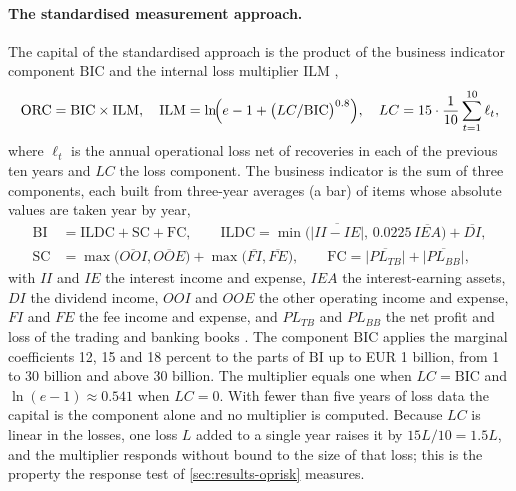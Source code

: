 \paragraph{The standardised measurement approach.} The capital of the standardised approach is the product of the business
indicator component $\mathrm{BIC}$ and the internal loss multiplier $\mathrm{ILM}$ \citep{oprisk:ope25},
\begin{equation}
\mathrm{ORC}=\mathrm{BIC}\times\mathrm{ILM},\quad
\mathrm{ILM}=\ln\!\Bigl(e-1+\bigl(LC/\mathrm{BIC}\bigr)^{0.8}\Bigr),\quad
LC=15\cdot\frac{1}{10}\sum_{t=1}^{10}\ell_t,
\label{eq:op-sma}
\end{equation}
where $\ell_t$ is the annual operational loss net of recoveries in each of the previous ten years and $LC$ the loss component. The
business indicator is the sum of three components, each built from three-year averages (a bar) of items whose absolute values are taken year by year,
\begin{equation}
\begin{aligned}
\mathrm{BI}&=\mathrm{ILDC}+\mathrm{SC}+\mathrm{FC},\qquad \mathrm{ILDC}=\min\bigl(\overline{|II-IE|},\,0.0225\,\overline{IEA}\bigr)+\overline{DI},\\
\mathrm{SC}&=\max\bigl(\overline{OOI},\overline{OOE}\bigr)+\max\bigl(\overline{FI},\overline{FE}\bigr),\qquad
\mathrm{FC}=\overline{|PL_{TB}|}+\overline{|PL_{BB}|},
\end{aligned}
\label{eq:op-bi}
\end{equation}
with $II$ and $IE$ the interest income and expense, $IEA$ the interest-earning assets, $DI$ the dividend income, $OOI$ and $OOE$ the other operating income and expense,
$FI$ and $FE$ the fee income and expense, and $PL_{TB}$ and $PL_{BB}$ the net profit and loss of the trading and banking books \citep{oprisk:ope25}. The
component $\mathrm{BIC}$ applies the marginal coefficients 12, 15 and 18 percent to the parts of $\mathrm{BI}$ up to EUR 1 billion, from 1 to 30
billion and above 30 billion. The multiplier equals one when $LC=\mathrm{BIC}$ and $\ln(e-1)\approx0.541$ when $LC=0$. With fewer than five years
of loss data the capital is the component alone and no multiplier is computed. Because $LC$ is linear in the losses, one loss $L$
added to a single year raises it by $15L/10=1.5L$, and the multiplier responds without bound to the size of that loss; this is
the property the response test of \cref{sec:results-oprisk} measures.

